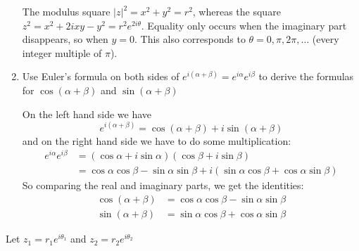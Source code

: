 \documentclass[10pt]{article}
\begin{document}
\begin{enumerate}[label=\alph*)]
			\begin{solution}
				The modulus square $|z|^2 = x^2 + y^2 = r^2$, whereas the square $z^2 = x^2 + 2ixy - y^2 = r^2
				e^{2i\theta}$. Equality only occurs when the imaginary part disappears, so when $y = 0$. This 
				also corresponds to $\theta = 0, \pi, 2\pi, \dots$ (every integer multiple of $\pi$).
			\end{solution}
		\item Use Euler's formula on both sides of $e^{i(\alpha + \beta)} = e^{i \alpha}e^{i \beta}$ to derive
			the formulas for $\cos(\alpha + \beta)$ and $\sin(\alpha + \beta)$

			\begin{solution}
				On the left hand side we have
				\[
					e^{i(\alpha + \beta)} = \cos(\alpha + \beta) + i \sin(\alpha + \beta)
				\] 
				and on the right hand side we have to do some multiplication: 
				\begin{align*}
					e^{i \alpha} e^{i \beta} &= (\cos \alpha + i \sin \alpha)(\cos \beta + i \sin \beta) \\
					&= \cos \alpha \cos \beta - \sin \alpha \sin \beta + i(\sin \alpha \cos \beta + \cos \alpha
					\sin \beta)
				\end{align*}
				So comparing the real and imaginary parts, we get the identities:
				\begin{align*}
					\cos(\alpha + \beta) &= \cos \alpha \cos \beta - \sin \alpha \sin \beta\\
					\sin(\alpha + \beta) &= \sin \alpha \cos \beta + \cos \alpha \sin \beta 
				\end{align*}
			\end{solution}

	\end{enumerate}
	Let $z_1 = r_1e^{i \theta_1}$ and $z_2 = r_2 e^{i \theta_2}$
\end{document}
